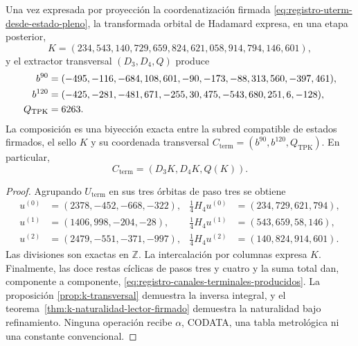 \begin{theorem}
\label{thm:registro-evaluacion-terminal-recuperada}
Una vez expresada por proyección la coordenatización firmada
\eqref{eq:registro-uterm-desde-estado-pleno}, la transformada orbital de
Hadamard expresa, en una etapa posterior,
\[
 K=(234,543,140,729,659,824,621,058,914,794,146,601),
\]
y el extractor transversal \((D_3,D_4,Q)\) produce
\begin{align}
 b^{90}={}&(-495,-116,-684,108,601,-90,
             -173,-88,313,560,-397,461),\notag\\
 b^{120}={}&(-425,-281,-481,671,-255,30,
              475,-543,680,251,6,-128),\notag\\
 Q_{\mathrm{TPK}}={}&6263.
 \label{eq:registro-canales-terminales-producidos}
\end{align}
La composición es una biyección exacta entre la subred compatible de estados
firmados, el sello \(K\) y su coordenada transversal
\(C_{\mathrm{term}}=(b^{90},b^{120},Q_{\mathrm{TPK}})\).
En particular,
\begin{equation}
 C_{\mathrm{term}}=(D_3K,D_4K,Q(K)).
 \label{eq:registro-cterm-desde-xterm}
\end{equation}
\end{theorem}

\begin{proof}
Agrupando \(U_{\mathrm{term}}\) en sus tres órbitas de paso tres se obtiene
\[
 \begin{aligned}
  u^{(0)}&=(2378,-452,-668,-322),&
  \tfrac14H_4u^{(0)}&=(234,729,621,794),\\
  u^{(1)}&=(1406,998,-204,-28),&
  \tfrac14H_4u^{(1)}&=(543,659,58,146),\\
  u^{(2)}&=(2479,-551,-371,-997),&
  \tfrac14H_4u^{(2)}&=(140,824,914,601).
 \end{aligned}
\]
Las divisiones son exactas en \(\mathbb Z\).
La intercalación por columnas expresa \(K\). Finalmente, las doce restas
cíclicas de pasos tres y cuatro y la suma total dan, componente a componente,
\eqref{eq:registro-canales-terminales-producidos}. La proposición
\ref{prop:k-transversal} demuestra la inversa integral, y el
teorema~\ref{thm:k-naturalidad-lector-firmado} demuestra la naturalidad bajo
refinamiento. Ninguna operación recibe \(\alpha\), CODATA, una tabla
metrológica ni una constante convencional.
\end{proof}


